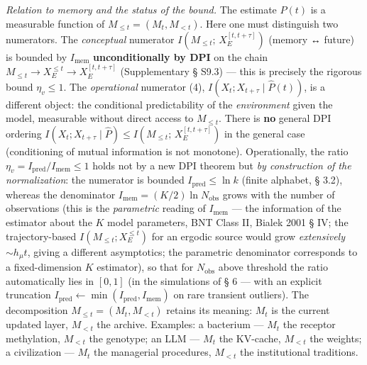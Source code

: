 \documentclass[pdflatex,sn-mathphys-ay]{sn-jnl}
\providecommand{\lt}{<}\providecommand{\gt}{>}
\begin{document}
\emph{Relation to memory and the status of the bound.} The estimate \(\hat P(t)\) is a measurable function of \(M_{\le t} = (M_t, M_{\lt t})\). Here one must distinguish two numerators. The \emph{conceptual} numerator \(I(M_{\le t};\, X_E^{[t,t+\tau]})\) (memory ↔ future) is bounded by \(I_{\text{mem}}\) \textbf{unconditionally by DPI} on the chain \(M_{\le t} \to X_E^{\le t} \to X_E^{[t,t+\tau]}\) (Supplementary § S9.3) --- this is precisely the rigorous bound \(\eta_v \le 1\). The \emph{operational} numerator (4), \(I(X_t; X_{t+\tau}\mid\hat P(t))\), is a different object: the conditional predictability of the \emph{environment} given the model, measurable without direct access to \(M_{\le t}\). There is \textbf{no} general DPI ordering \(I(X_t; X_{t+\tau}\mid\hat P) \le I(M_{\le t};\, X_E^{[t,t+\tau]})\) in the general case (conditioning of mutual information is not monotone). Operationally, the ratio \(\eta_v = I_{\text{pred}}/I_{\text{mem}} \le 1\) holds not by a new DPI theorem but \emph{by construction of the normalization}: the numerator is bounded \(I_{\text{pred}} \le \ln k\) (finite alphabet, § 3.2), whereas the denominator \(I_{\text{mem}} = (K/2)\ln N_{\text{obs}}\) grows with the number of observations (this is the \emph{parametric} reading of \(I_{\text{mem}}\) --- the information of the estimator about the \(K\) model parameters, BNT Class II, Bialek 2001 § IV; the trajectory-based \(I(M_{\le t}; X_E^{\le t})\) for an ergodic source would grow \emph{extensively} \(\sim h_\mu t\), giving a different asymptotics; the parametric denominator corresponds to a fixed-dimension \(K\) estimator), so that for \(N_{\text{obs}}\) above threshold the ratio automatically lies in \([0,1]\) (in the simulations of § 6 --- with an explicit truncation \(I_{\text{pred}} \gets \min(I_{\text{pred}}, I_{\text{mem}})\) on rare transient outliers). The decomposition \(M_{\le t} = (M_t, M_{\lt t})\) retains its meaning: \(M_t\) is the current updated layer, \(M_{\lt t}\) the archive. Examples: a bacterium --- \(M_t\) the receptor methylation, \(M_{\lt t}\) the genotype; an LLM --- \(M_t\) the KV-cache, \(M_{\lt t}\) the weights; a civilization --- \(M_t\) the managerial procedures, \(M_{\lt t}\) the institutional traditions.
\end{document}
